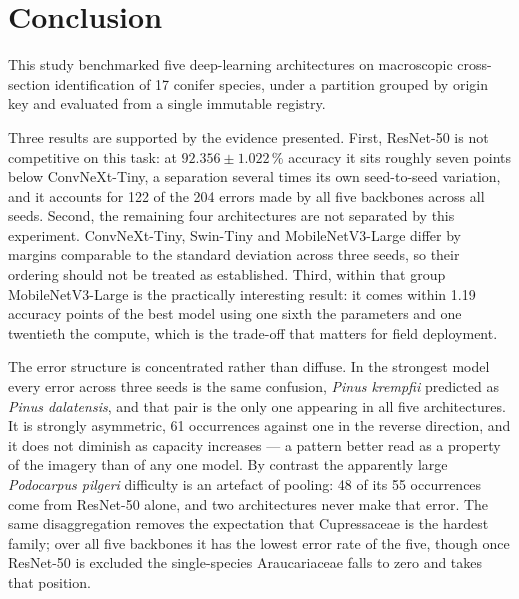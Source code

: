 %

\section{Conclusion}
\label{sec:conclusion}

This study benchmarked five deep-learning architectures on macroscopic
cross-section identification of 17 conifer species, under a partition
grouped by origin key and evaluated from a single immutable registry.

Three results are supported by the evidence presented. First, ResNet-50 is
not competitive on this task: at $92.356 \pm 1.022$\,\% accuracy it sits
roughly seven points below ConvNeXt-Tiny, a separation several times its own
seed-to-seed variation, and it accounts for 122 of the 204 errors made by
all five backbones across all seeds. Second, the remaining four architectures
are not separated by this experiment. ConvNeXt-Tiny, Swin-Tiny and
MobileNetV3-Large differ by margins comparable to the standard deviation
across three seeds, so their ordering should not be treated as established.
Third, within that group MobileNetV3-Large is the practically interesting
result: it comes within 1.19 accuracy points of the best model using one
sixth the parameters and one twentieth the compute, which is the trade-off
that matters for field deployment.

The error structure is concentrated rather than diffuse. In the strongest
model every error across three seeds is the same confusion, \textit{Pinus
krempfii} predicted as \textit{Pinus dalatensis}, and that pair is the only
one appearing in all five architectures. It is strongly asymmetric, 61
occurrences against one in the reverse direction, and it does not diminish
as capacity increases --- a pattern better read as a property of the imagery
than of any one model. By contrast the apparently large
\textit{Podocarpus pilgeri} difficulty is an artefact of pooling: 48 of its
55 occurrences come from ResNet-50 alone, and two architectures never make
that error. The same disaggregation removes the expectation that
Cupressaceae is the hardest family; over all five backbones it has the lowest
error rate of the five, though once ResNet-50 is excluded the single-species
Araucariaceae falls to zero and takes that position.

